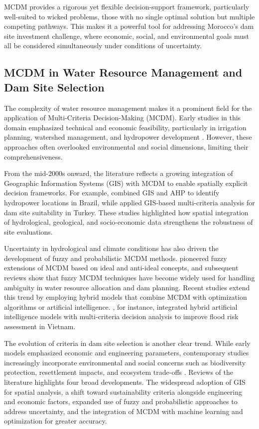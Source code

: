MCDM provides a rigorous yet flexible decision-support framework, particularly well-suited to wicked problems, those with no single optimal solution but multiple competing pathways. This makes it a powerful tool for addressing Morocco's dam site investment challenge, where economic, social, and environmental goals must all be considered simultaneously under conditions of uncertainty.

\subsection{MCDM in Water Resource Management and Dam Site Selection}
The complexity of water resource management makes it a prominent field for the application of Multi-Criteria Decision-Making (MCDM). Early studies in this domain emphasized technical and economic feasibility, particularly in irrigation planning, watershed management, and hydropower development \cite{POHEKAR2004,Romanelli2018}. However, these approaches often overlooked environmental and social dimensions, limiting their comprehensiveness.

From the mid-2000s onward, the literature reflects a growing integration of Geographic Information Systems (GIS) with MCDM to enable spatially explicit decision frameworks. For example, \cite{Romanelli2018} combined GIS and AHP to identify hydropower locations in Brazil, while \cite{karakus2022} applied GIS-based multi-criteria analysis for dam site suitability in Turkey. These studies highlighted how spatial integration of hydrological, geological, and socio-economic data strengthens the robustness of site evaluations.

Uncertainty in hydrological and climate conditions has also driven the development of fuzzy and probabilistic MCDM methods. \cite{LIANG1999} pioneered fuzzy extensions of MCDM based on ideal and anti-ideal concepts, and subsequent reviews \cite{Mardani2015} show that fuzzy MCDM techniques have become widely used for handling ambiguity in water resource allocation and dam planning. Recent studies extend this trend by employing hybrid models that combine MCDM with optimization algorithms or artificial intelligence. \cite{PHAM2021}, for instance, integrated hybrid artificial intelligence models with multi-criteria decision analysis to improve flood risk assessment in Vietnam.

The evolution of criteria in dam site selection is another clear trend. While early models emphasized economic and engineering parameters, contemporary studies increasingly incorporate environmental and social concerns such as biodiversity protection, resettlement impacts, and ecosystem trade-offs \cite{Dirie2024,karakus2022}. Reviews of the literature highlights four broad developments. The widespread adoption of GIS for spatial analysis, a shift toward sustainability criteria alongside engineering and economic factors, expanded use of fuzzy and probabilistic approaches to address uncertainty, and the integration of MCDM with machine learning and optimization for greater accuracy.

